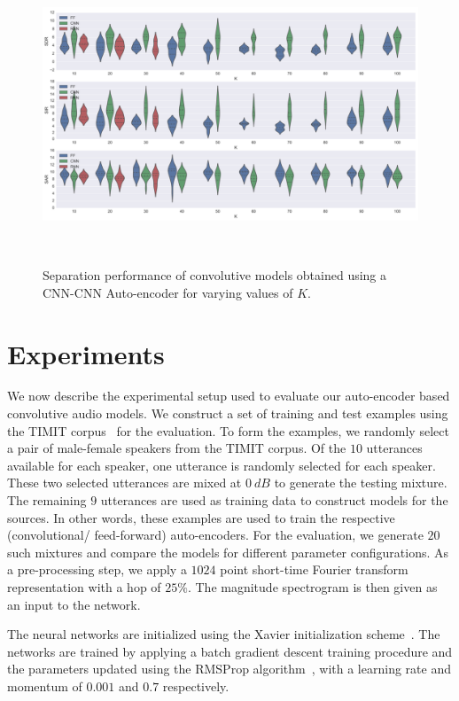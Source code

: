\documentclass{article}
\begin{document}
\begin{figure}[ht!]
\centering
  \includegraphics[clip, trim = 0cm 0cm 0cm 0cm, width=\linewidth]{Figs/FullPerformance.png}
  \caption{Separation performance of convolutive models obtained using a CNN-CNN Auto-encoder for varying values of $K$. }~\label{fig:cnnseparation_performance}
\end{figure}

\section{Experiments}
\label{sec:experiments}
We now describe the experimental setup used to evaluate our auto-encoder based convolutive audio models. We construct a set of training and test examples using the TIMIT corpus~\cite{timit} for the evaluation. To form the examples, we randomly select a pair of male-female speakers from the TIMIT corpus. Of the $10$ utterances available for each speaker, one utterance is randomly selected for each speaker. These two selected utterances are mixed at $0~dB$ to generate the testing mixture. The remaining $9$ utterances are used as training data to construct models for the sources. In other words, these examples are used to train the respective (convolutional/ feed-forward) auto-encoders. For the evaluation, we generate $20$ such mixtures and compare the models for different parameter configurations. As a pre-processing step, we apply a $1024$ point short-time Fourier transform representation with a hop of $25\%$. The magnitude spectrogram is then given as an input to the network. 

The neural networks are initialized using the Xavier initialization scheme~\cite{glorot2010understanding}. The networks are trained by applying a batch gradient descent training procedure and the parameters updated using the RMSProp algorithm~\cite{tieleman2012rmsprop}, with a learning rate and momentum of $0.001$ and $0.7$ respectively.
\end{document}
